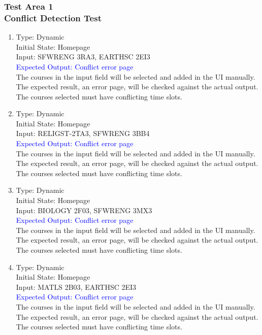 \documentclass[11pt, oneside]{article}   	%
\begin{document}
\subsubsection{Test Area 1 \\ Conflict Detection Test}
\begin{enumerate}
\item Type: Dynamic \\
Initial State: Homepage \\
Input: SFWRENG 3RA3, EARTHSC 2EI3 \\
\textcolor{blue}{Expected Output: Conflict error page} \\
The courses in the input field will be selected and added in the UI manually. The expected result, an error page, will be checked against the actual output. The courses selected must have conflicting time slots. \\

\item Type: Dynamic \\
Initial State: Homepage \\
Input: RELIGST-2TA3, SFWRENG 3BB4 \\
\textcolor{blue}{Expected Output: Conflict error page} \\
The courses in the input field will be selected and added in the UI manually. The expected result, an error page, will be checked against the actual output. The courses selected must have conflicting time slots. \\


\item Type: Dynamic \\
Initial State: Homepage \\
Input: BIOLOGY 2F03, SFWRENG 3MX3 \\
\textcolor{blue}{Expected Output: Conflict error page} \\
The courses in the input field will be selected and added in the UI manually. The expected result, an error page, will be checked against the actual output. The courses selected must have conflicting time slots. \\


\item Type: Dynamic \\
Initial State: Homepage \\
Input: MATLS 2B03, EARTHSC 2EI3 \\
\textcolor{blue}{Expected Output: Conflict error page} \\
The courses in the input field will be selected and added in the UI manually. The expected result, an error page, will be checked against the actual output. The courses selected must have conflicting time slots. \\
\end{enumerate}
\end{document}
